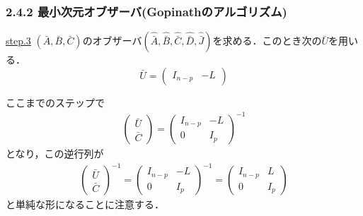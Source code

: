 \begin{frame}[t]
\frametitle{2.4.2 最小次元オブザーバ(Gopinathのアルゴリズム)}
\noindent \underline{step.3}
$(\bar{A}, \bar{B}, \bar{C})$のオブザーバ$(\hat{\bar{A}}, \hat{\bar{B}}, \hat{\bar{C}}, \hat{\bar{D}}, \hat{\bar{J}})$を求める．このとき次の$\bar{U}$を用いる．
\begin{equation}
   \bar{U} = \left(\begin{array}{cc}
		I_{n-p} & -L
	     \end{array}\right)
\end{equation}

ここまでのステップで
\begin{align}
	\left(\begin{array}{c}
		\bar{U} \\
		\bar{C}
	\end{array}\right)
	=
	\left(\begin{array}{cc}
		I_{n-p} & -L \\
		0 &  I_{p} 
	\end{array}\right) ^{-1}
\end{align}
となり，この逆行列が
\begin{align}
	\left(\begin{array}{c}
		\bar{U} \\
		\bar{C}
	\end{array}\right)^{-1}
	=
	\left(\begin{array}{cc}
		I_{n-p} & -L \\
		0 &  I_{p} 
	\end{array}\right) ^{-1}
	=
	\left(\begin{array}{cc}
		I_{n-p} & L \\
		0 &  I_{p} 
	\end{array}\right)
\end{align}
と単純な形になることに注意する．\\

\end{frame}

